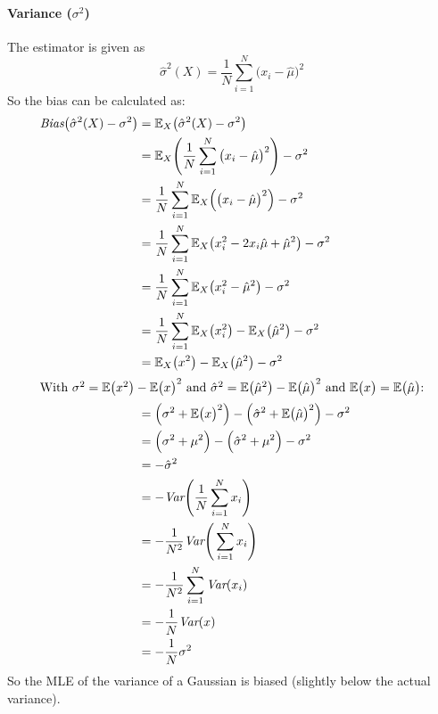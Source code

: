 \documentclass[a4paper, 11pt, accentcolor = tud3b]{tudreport}
\newcommand{\E}{\ensuremath{\mathbb{E}}}
\newcommand{\Var}{\ensuremath{\textit{Var}}}
\newcommand{\Bias}{\ensuremath{\textit{Bias}}}
\begin{document}
				\paragraph{Variance (\(\sigma^2\))}
					The estimator is given as
					\begin{equation}
						\hat{\sigma}^2(X) = \frac{1}{N} \sum_{i = 1}^{N} \big(x_i - \hat{\mu}\big)^2
					\end{equation}
					So the bias can be calculated as:
					\begin{align}
						\Bias\big(\hat{\sigma}^2(X) - \sigma^2\big) &= \E_X\big(\hat{\sigma}^2(X) - \sigma^2\big) \\
							&= \E_X\Bigg( \frac{1}{N} \sum_{i = 1}^{N} \big(x_i - \hat{\mu}\big)^2 \Bigg) - \sigma^2 \\
							&= \frac{1}{N} \sum_{i = 1}^{N} \E_X\Big(\big(x_i - \hat{\mu}\big)^2\Big) - \sigma^2 \\
							&= \frac{1}{N} \sum_{i = 1}^{N} \E_X\big( x_i^2 - 2 x_i \hat{\mu} + \hat{\mu}^2 \big) - \sigma^2 \\
							&= \frac{1}{N} \sum_{i = 1}^{N} \E_X\big( x_i^2 - \hat{\mu}^2 \big) - \sigma^2 \\
							&= \frac{1}{N} \sum_{i = 1}^{N} \E_X\big( x_i^2 \big) - \E_X\big( \hat{\mu}^2 \big) - \sigma^2 \\
							&= \E_X\big( x^2 \big) - \E_X\big( \hat{\mu}^2 \big) - \sigma^2 \\
						\intertext{With \( \sigma^2 = \E\big(x^2\big) - \E\big(x\big)^2 \) and \( \hat{\sigma}^2 = \E\big(\hat{\mu}^2\big) - \E\big(\hat{\mu}\big)^2 \) and \( \E\big(x\big) = \E\big(\hat{\mu}\big) \):}
							&= \Big(\sigma^2 + \E\big(x\big)^2\Big) - \Big(\hat{\sigma}^2 + \E\big(\hat{\mu}\big)^2\Big) - \sigma^2 \\
							&= \Big(\sigma^2 + \mu^2\Big) - \Big(\hat{\sigma}^2 + \mu^2\Big) - \sigma^2 \\
							&= -\hat{\sigma}^2 \\
							&= -\Var\Bigg( \frac{1}{N} \sum_{i = 1}^{N} x_i \Bigg) \\
							&= -\frac{1}{N^2} \Var\Bigg( \sum_{i = 1}^{N} x_i \Bigg) \\
							&= -\frac{1}{N^2} \sum_{i = 1}^{N} \Var(x_i) \\
							&= -\frac{1}{N} \Var(x) \\
							&= -\frac{1}{N} \sigma^2
					\end{align}
					So the MLE of the variance of a Gaussian is biased (slightly below the actual variance).
\end{document}
